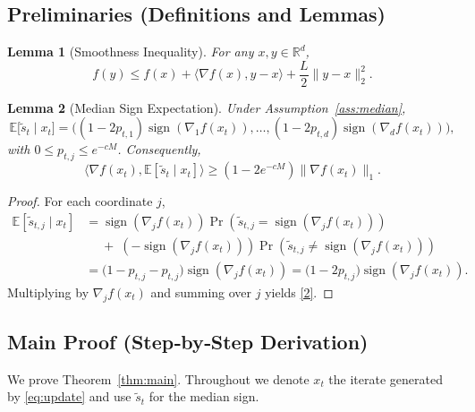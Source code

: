 \documentclass{article}
\newtheorem{lemma}{Lemma}
\newcommand{\sign}{\operatorname{sign}}
\newcommand{\E}{\mathbb{E}}
\newcommand{\R}{\mathbb{R}}
\begin{document}
\subsection*{Preliminaries (Definitions and Lemmas)}
\begin{lemma}[Smoothness Inequality]\label{lem:smooth}
For any $x,y\in\R^{d}$,
\[
f(y)\le f(x)+\langle\nabla f(x),y-x\rangle+\frac{L}{2}\|y-x\|_{2}^{2}.
\]
\end{lemma}
\begin{lemma}[Median Sign Expectation]\label{lem:median}
Under Assumption~\ref{ass:median},
\[
\E\big[\tilde{s}_{t}\mid x_{t}\big]
      =\big((1-2p_{t,1})\sign(\nabla_{1}f(x_{t})),\dots,
        (1-2p_{t,d})\sign(\nabla_{d}f(x_{t}))\big),
\]
with $0\le p_{t,j}\le e^{-cM}$.
Consequently,
\[
\langle\nabla f(x_{t}),\E[\tilde{s}_{t}\mid x_{t}]\rangle
   \ge (1-2e^{-cM})\|\nabla f(x_{t})\|_{1}.
\tag{2}
\]
\end{lemma}
\begin{proof}
For each coordinate $j$,
\[
\begin{aligned}
\E[\tilde{s}_{t,j}\mid x_{t}]
 &=\sign(\nabla_{j}f(x_{t}))\Pr(\tilde{s}_{t,j}=\sign(\nabla_{j}f(x_{t})))\\
 &\quad\;+\;(-\sign(\nabla_{j}f(x_{t})))\Pr(\tilde{s}_{t,j}\neq\sign(\nabla_{j}f(x_{t})))\\
 &=\big(1-p_{t,j}-p_{t,j}\big)\sign(\nabla_{j}f(x_{t}))
   =\big(1-2p_{t,j}\big)\sign(\nabla_{j}f(x_{t})).
\end{aligned}
\]
Multiplying by $\nabla_{j}f(x_{t})$ and summing over $j$ yields \eqref{2}.
\end{proof}

\subsection*{Main Proof (Step‑by‑Step Derivation)}
We prove Theorem~\ref{thm:main}.  Throughout we denote $x_{t}$ the iterate
generated by \eqref{eq:update} and use $\tilde{s}_{t}$ for the median sign.
\end{document}
